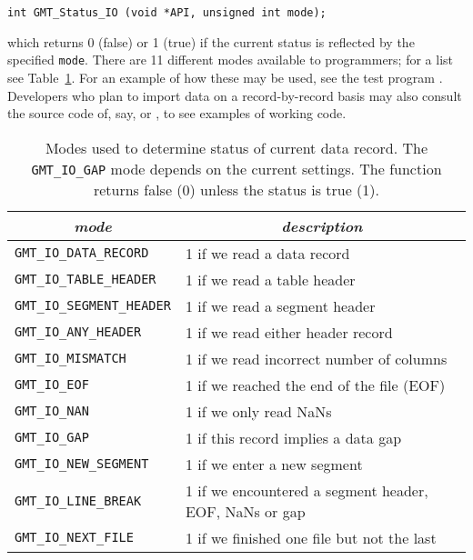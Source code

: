 \documentclass[11pt]{report}
\begin{document}
\begin{verbatim}
int GMT_Status_IO (void *API, unsigned int mode);
\end{verbatim}

which returns 0 (false) or 1 (true) if the current status is reflected by the specified \texttt{mode}.
There are 11 different modes available to programmers; for a list see Table~\ref{tbl:iostatus}.
For an example of how these may be used, see the test program .
Developers who plan to import data on a record-by-record basis may also consult the source
code of, say,  or , to see examples of working code.

\begin{table}[h]
\small
\centering
\begin{tabular}{|l|l|} \hline
\multicolumn{1}{|c|}{\emph{mode}} & \multicolumn{1}{c|}{\emph{description}} \\ \hline
\texttt{GMT\_IO\_DATA\_RECORD}	&       1 if we read a data record \\ \hline
\texttt{GMT\_IO\_TABLE\_HEADER}	&       1 if we read a table header \\ \hline
\texttt{GMT\_IO\_SEGMENT\_HEADER}	&       1 if we read a segment header \\ \hline
\texttt{GMT\_IO\_ANY\_HEADER}	&       1 if we read either header record \\ \hline
\texttt{GMT\_IO\_MISMATCH}	&       1 if we read incorrect number of columns \\ \hline
\texttt{GMT\_IO\_EOF}		&       1 if we reached the end of the file (EOF) \\ \hline
\texttt{GMT\_IO\_NAN}		&       1 if we only read NaNs \\ \hline
\texttt{GMT\_IO\_GAP}		&       1 if this record implies a data gap \\ \hline
\texttt{GMT\_IO\_NEW\_SEGMENT}	&       1 if we enter a new segment \\ \hline
\texttt{GMT\_IO\_LINE\_BREAK}	&       1 if we encountered a segment header, EOF, NaNs or gap \\ \hline
\texttt{GMT\_IO\_NEXT\_FILE}	&       1 if we finished one file but not the last \\ \hline
\end{tabular}
\caption{Modes used to determine status of current data record.  The \texttt{GMT\_IO\_GAP} mode depends
on the current  settings.  The function returns false (0) unless the status is true (1).}
\label{tbl:iostatus}
\end{table}
\end{document}
